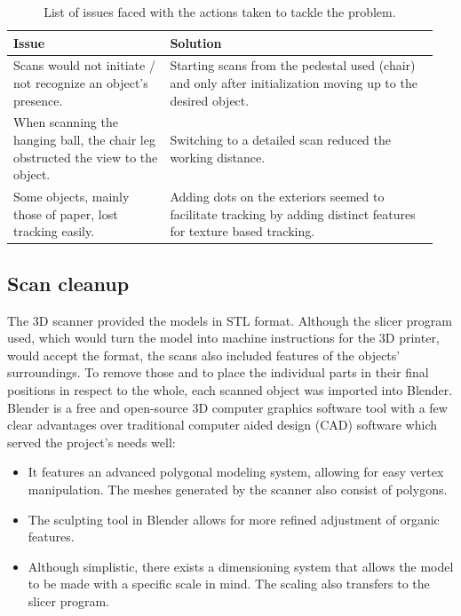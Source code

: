 \documentclass[12pt,a4paper]{article}
\begin{document}
\renewcommand{\arraystretch}{2}
\begin{table}[h]

  \centering
  \begin{tabular}{ | p{0.35\linewidth} | p{0.6\linewidth} | }
    \hline
    Issue & Solution \\
    \hline
    Scans would not initiate / not recognize an object's presence. & Starting
    scans from the pedestal used (chair) and only after initialization moving up
    to the desired object. \\
    When scanning the hanging ball, the chair leg obstructed the view to the
    object. & Switching to a detailed scan reduced the working distance.\\
    Some objects, mainly those of paper, lost tracking easily. & Adding dots on
    the exteriors seemed to facilitate tracking by adding distinct features for
    texture based tracking.\\
    \hline
  \end{tabular}
  \caption{List of issues faced with the actions taken to tackle the problem.}
\end{table}

\subsection{Scan cleanup}

The 3D scanner provided the models in STL format. Although the slicer program
used, which would turn the model into machine instructions for the 3D printer,
would accept the format, the scans also included features of the objects'
surroundings. To remove those and to place the individual parts in their final
positions in respect to the whole, each scanned object was imported into
Blender. Blender is a free and open-source 3D computer graphics software tool
with a few clear advantages over traditional computer aided design (CAD)
software which served the project's needs well:

\begin{itemize}
  \item It features an advanced polygonal modeling system, allowing for easy
    vertex manipulation. The meshes generated by the scanner also consist of
    polygons.
  \item The sculpting tool in Blender allows for more refined adjustment of
    organic features.
  \item Although simplistic, there exists a dimensioning system that allows the
    model to be made with a specific scale in mind. The scaling also transfers
    to the slicer program.
\end{itemize}
\end{document}
